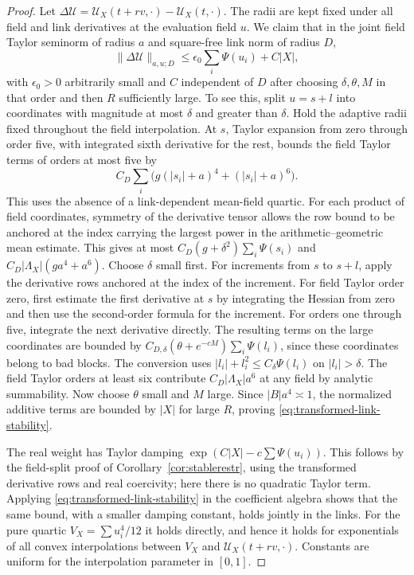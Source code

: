 \documentclass[11pt]{article}
\begin{document}
\begin{proof}
Let \(\Delta\mathcal U=\mathcal U_X(t+rv,\cdot)-\mathcal U_X(t,\cdot)\).
The radii are kept fixed under all field and link derivatives at
the evaluation field \(u\).
We claim that in the joint field Taylor seminorm of radius \(a\)
and square-free link norm of radius \(D\),
\begin{equation}\label{eq:transformed-link-stability}
 \|\Delta\mathcal U\|_{a,u;D}
       \le \epsilon_0\sum_i\Psi(u_i)+C|X|,
\end{equation}
with \(\epsilon_0>0\) arbitrarily small and \(C\) independent of
\(D\) after choosing \(\delta,\theta,M\) in that order and then
\(R\) sufficiently large. To see this, split \(u=s+l\) into
coordinates with magnitude at most \(\delta\) and greater than
\(\delta\). Hold the adaptive radii fixed throughout the field
interpolation. At \(s\), Taylor expansion from zero through
order five, with integrated sixth derivative for the rest,
bounds the field Taylor terms of orders at most five by
\[
 C_D\sum_i\bigl(g(|s_i|+a)^4+(|s_i|+a)^6\bigr).
\]
This uses the absence of a link-dependent mean-field quartic.
For each product of field coordinates, symmetry of the
derivative tensor allows the row bound to be anchored at the
index carrying the largest power in the arithmetic--geometric
mean estimate. This gives at most
\(C_D(g+\delta^2)\sum_i\Psi(s_i)\) and
\(C_D|\Lambda_X|(ga^4+a^6)\). Choose \(\delta\) small first.
For increments from \(s\) to \(s+l\), apply the derivative rows
anchored at the index of the increment. For field Taylor order
zero, first estimate the first derivative at \(s\) by integrating
the Hessian from zero and then use the second-order formula for
the increment. For orders one through five, integrate the next
derivative directly. The resulting terms on the large coordinates
are bounded by \(C_{D,\delta}(\theta+e^{-cM})\sum_i\Psi(l_i)\),
since these coordinates belong to bad blocks. The conversion
uses \(|l_i|+l_i^2\le C_\delta\Psi(l_i)\) on \(|l_i|>\delta\).
The field Taylor orders at least six contribute
\(C_D|\Lambda_X|a^6\) at any field by analytic summability.
Now choose \(\theta\) small and \(M\) large. Since
\(|B|a^4\asymp1\), the normalized additive terms are bounded by
\(|X|\) for large \(R\), proving \eqref{eq:transformed-link-stability}.

The real weight has Taylor damping
\(\exp(C|X|-c\sum\Psi(u_i))\). This follows by the field-split
proof of Corollary~\ref{cor:stablerestr}, using the transformed
derivative rows and real coercivity; here there is no quadratic
Taylor term. Applying \eqref{eq:transformed-link-stability} in
the coefficient algebra shows that the same bound, with a
smaller damping constant, holds jointly in the links. For the
pure quartic \(V_X=\sum u_i^4/12\) it holds directly, and hence
it holds for exponentials of all convex interpolations between
\(V_X\) and \(\mathcal U_X(t+rv,\cdot)\). Constants are uniform
for the interpolation parameter in \([0,1]\).


\end{proof}
\end{document}
